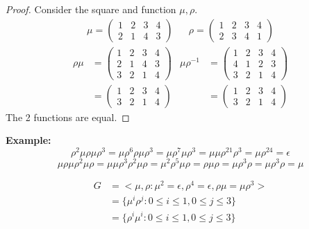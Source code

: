 \documentclass[openany]{report}
\begin{document}
\begin{proof}
Consider the square and function $\mu,\rho$.\\
    \drawsquare 
    \begin{align*}
        \mu = \begin{pmatrix}
    1 & 2 & 3 & 4\\
    2 & 1 & 4 & 3
    \end{pmatrix} &&
    \rho = \begin{pmatrix}
        1 & 2 & 3 & 4\\
        2 & 3 & 4 & 1
    \end{pmatrix}
    \end{align*}
    \begin{align*}
        \rho\mu &= \begin{pmatrix}
            1 & 2 & 3 & 4\\
            2 & 1 & 4 & 3\\
            3 & 2 & 1 & 4
        \end{pmatrix}&
        \mu\rho^{-1} &= \begin{pmatrix}
            1 & 2 & 3 & 4\\
            4 & 1 & 2 & 3\\
            3 & 2 & 1 & 4
        \end{pmatrix}\\
        &= \begin{pmatrix}
            1 & 2 & 3 & 4\\
            3 & 2 & 1 & 4
        \end{pmatrix} &
        &= \begin{pmatrix}
            1 & 2 & 3 & 4\\
            3 & 2 & 1 & 4
        \end{pmatrix}
    \end{align*}
    The 2 functions are equal.
\end{proof}
\textbf{Example:}
$$\rho^2\mu\rho\mu\rho^3 = \mu\rho^6\rho\mu\rho^3 = \mu\rho^7\mu\rho^3 = \mu\mu\rho^{21}\rho^3=\mu\rho^{24} = \epsilon$$
$$\mu\rho\mu\rho^2\mu\rho = \mu\mu\rho^3\rho^2\mu\rho=\mu^2\rho^5\mu\rho=\rho\mu\rho=\mu\rho^3\rho=\mu\rho^3\rho = \mu$$
\begin{corollary}
    \begin{align*}
        G &= <\mu, \rho : \mu^2 = \epsilon, \rho^4 = \epsilon, \rho\mu=\mu\rho^3>\\
        &= \{\mu^i\rho^j: 0 \leq i \leq 1, 0 \leq j \leq 3\}\\
        &= \{\rho^i\mu^i: 0\leq i\leq 1, 0\leq j \leq 3\}
    \end{align*}
\end{corollary}
\end{document}
